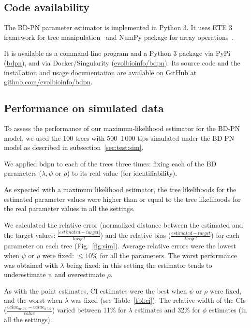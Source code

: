 \documentclass[a4paper,10pt]{article}
\begin{document}
\subsection*{Code availability}
The BD-PN parameter estimator is implemented in Python 3. It uses ETE 3 framework for tree manipulation~\citep{Huerta-Cepas2016} and NumPy package for array operations~\citep{harris_array_2020}. 

It is available as a command-line program and a Python 3 package via PyPi (\href{https://pypi.org/project/bdpn}{bdpn}), and via Docker/Singularity (\href{https://hub.docker.com/r/evolbioinfo/bdpn/tags}{evolbioinfo/bdpn}). Its source code and the installation and usage documentation are available on GitHub at \href{https://github.com/evolbioinfo/bdpn}{github.com/evolbioinfo/bdpn}.

\subsection{Performance on simulated data}

To assess the performance of our maximum-likelihood estimator for the BD-PN model, we used the 100 trees with 500--1\,000 tips simulated under the BD-PN model as described in subsection~\ref{sec:test:sim}.

We applied bdpn to each of the trees three times: fixing each of the BD parameters ($\lambda,\psi$ or $\rho$) to its real value (for identifiability). 


As expected with a maximum likelihood estimator, the tree likelihoods for the estimated parameter values were higher than or equal to the tree likelihoods for the real parameter values in all the settings.

We calculated the relative error (normalized distance between the estimated and the target values: $\frac{|estimated - target|}{target}$) and the relative bias ($\frac{estimated - target}{target}$) for each parameter on each tree (Fig.~\ref{fig:sim}). 
Average relative errors were the lowest when $\psi$ or $\rho$ were fixed: $\leq 10\%$  for all the parameters. The worst performance was obtained with $\lambda$ being fixed: in this setting the estimator tends to underestimate $\psi$ and overestimate $\rho$.

As with the point estimates, CI estimates were the best when $\psi$ or $\rho$ were fixed, and the worst when $\lambda$ was fixed (see Table~\ref{tbl:ci}). The relative width of the CIs ($\frac{value_{97.5\%} - value_{2.5\%}}{value}$) varied between 11\% for $\lambda$ estimates and 32\% for $\phi$ estimates (in all the settings).
\end{document}
